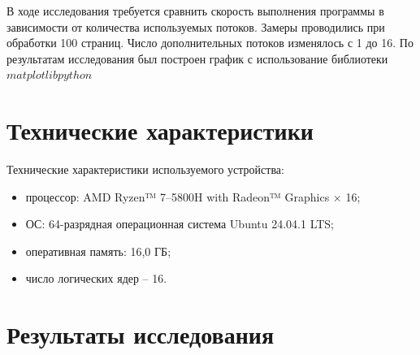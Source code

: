 

В ходе исследования требуется сравнить скорость выполнения программы в зависимости от количества используемых потоков.
Замеры проводились при обработки 100 страниц. Число дополнительных потоков изменялось с 1 до 16.
По результатам исследования был построен график с использование библиотеки $matplotlib python$~\cite{plot}\newpage


\section{Технические характеристики}
Технические характеристики используемого устройства:
\begin{itemize}
    \item процессор: AMD Ryzen™ 7--5800H with Radeon™ Graphics × 16;
    \item ОС: 64-разрядная операционная система Ubuntu 24.04.1 LTS;
    \item оперативная память: 16,0 ГБ;
    \item число логических ядер -- 16.
\end{itemize}

\section{Результаты исследования}

